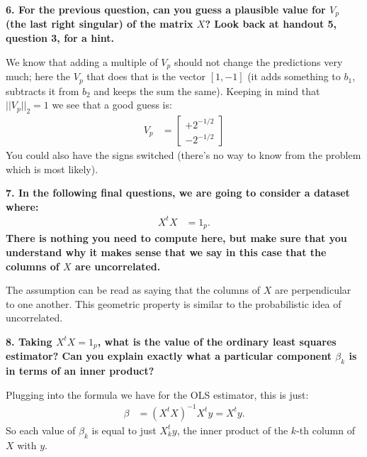 \documentclass[12pt,hidelinks]{article}
\numberwithin{equation}{section}
\begin{document}
\vspace*{12pt}

\textbf{6. For the previous question, can you guess a plausible value for $V_p$
(the last right singular) of the matrix $X$? Look back at handout 5, question 3,
for a hint.}

\vspace*{12pt}

We know that adding a multiple of $V_p$ should not change the predictions very
much; here the $V_p$ that does that is the vector $[1, -1]$ (it adds something
to $b_1$, subtracts it from $b_2$ and keeps the sum the same). Keeping in mind
that $|| V_p ||_2 = 1$ we see that a good guess is:
\begin{align}
V_p &= \begin{bmatrix} +2^{-1/2} \\ -2^{-1/2} \end{bmatrix}
\end{align}
You could also have the signs switched (there's no way to know from the problem
which is most likely).

\vspace*{12pt}

\textbf{7. In the following final questions, we are going to consider a dataset
where:}
\begin{align}
X^t X &= 1_p.
\end{align}
\textbf{There is nothing you need to compute here, but make sure that you understand
why it makes sense that we say in this case that the columns of $X$ are uncorrelated.}

\vspace*{12pt}

The assumption can be read as saying that the columns of $X$ are perpendicular to
one another. This geometric property is similar to the probabilistic idea of uncorrelated.

\vspace*{12pt}

\textbf{8. Taking $X^t X = 1_p$, what is the value of the ordinary least
squares estimator? Can you explain exactly what a particular component $\beta_k$
is in terms of an inner product?}

\vspace*{12pt}

Plugging into the formula we have for the OLS estimator, this is just:
\begin{align}
\beta &= (X^t X)^{-1} X^t y = X^t y.
\end{align}
So each value of $\beta_k$ is equal to just $X_k^t y$,
the inner product of the $k$-th column of $X$ with $y$.
\end{document}
